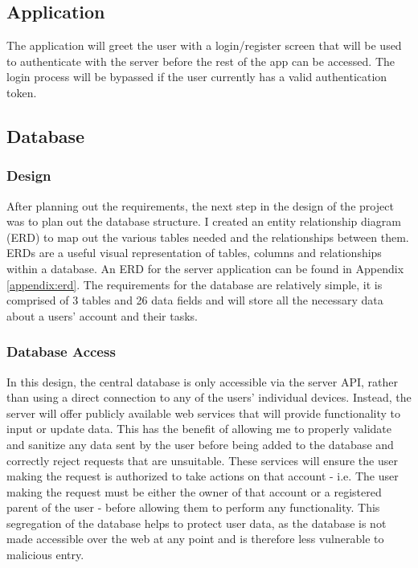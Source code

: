\subsection{Application}
The application will greet the user with a login/register screen that will be used to authenticate with the server before the rest of the app can be accessed.
The login process will be bypassed if the user currently has a valid authentication token.

\subsection{Database}
\subsubsection{Design}
After planning out the requirements, the next step in the design of the project was to plan out the database structure.
I created an entity relationship diagram (ERD) to map out the various tables needed and the relationships between them.
ERDs are a useful visual representation of tables, columns and relationships within a database.
An ERD for the server application can be found in Appendix \ref{appendix:erd}.
The requirements for the database are relatively simple, it is comprised of 3 tables and 26 data fields and will store all the necessary data about a users' account and their tasks.

\subsubsection{Database Access}
In this design, the central database is only accessible via the server API, rather than using a direct connection to any of the users' individual devices.
Instead, the server will offer publicly available web services that will provide functionality to input or update data. 
This has the benefit of allowing me to properly validate and sanitize any data sent by the user before being added to the database and correctly reject requests that are unsuitable. 
These services will ensure the user making the request is authorized to take actions on that account - i.e. The user making the request must be either the owner of that account or a registered parent of the user - before allowing them to perform any functionality.
This segregation of the database helps to protect user data, as the database is not made accessible over the web at any point and is therefore less vulnerable to malicious entry.

